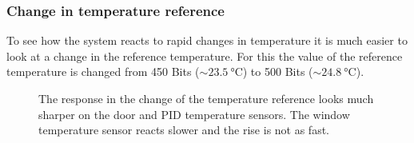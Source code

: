 \documentclass[12pt]{scrartcl}
\begin{document}
      \subsubsection{Change in temperature reference}
      To see how the system reacts to rapid changes in temperature it is much
      easier to look at a change in the reference temperature. For this the value
      of the reference temperature is changed from 450 Bits ($\sim 23.5
      ~\text{°C}$) to 500 Bits ($\sim 24.8~\text{°C}$). \\
      \begin{figure}[H]
        \hspace{-40pt}
        \hspace{-20pt}
        \caption{The response in the change of the temperature reference looks
        much sharper on the door and PID temperature sensors. The window temperature
        sensor reacts slower and the rise is not as fast.}
        \label{fig12}
      \end{figure}
\end{document}
